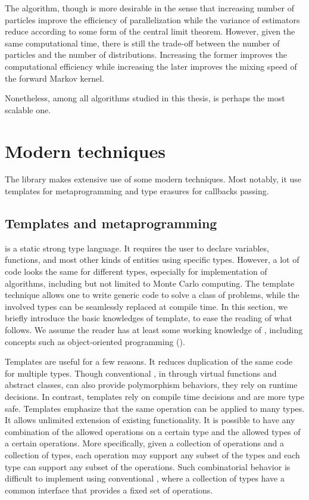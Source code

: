 The \smc algorithm, though is more desirable in the sense that increasing
number of particles improve the efficiency of parallelization while the
variance of estimators reduce according to some form of the central limit
theorem. However, given the same computational time, there is still the
trade-off between the number of particles and the number of distributions.
Increasing the former improves the computational efficiency while increasing
the later improves the mixing speed of the forward Markov kernel.

Nonetheless, among all algorithms studied in this thesis, \smc is perhaps the
most scalable one.

\section{Modern \protect\cpp techniques}
\label{sec:Modern C++ techniques}

The \vsmc library makes extensive use of some modern \cpp techniques. Most
notably, it use templates for metaprogramming and type erasures for callbacks
passing.

\subsection{Templates and metaprogramming}
\label{sub:Templates and metaprogramming}

\cpp is a static strong type language. It requires the user to declare
variables, functions, and most other kinds of entities using specific types.
However, a lot of code looks the same for different types, especially for
implementation of algorithms, including but not limited to Monte Carlo
computing. The \cpp template technique allows one to write generic code to
solve a class of problems, while the involved types can be seamlessly replaced
at compile time. In this section, we briefly introduce the basic knowledges of
\cpp template, to ease the reading of what follows. We assume the reader has
at least some working knowledge of \cpp, including concepts such as
object-oriented programming (\oop).

Templates are useful for a few reasons. It reduces duplication of the same
code for multiple types. Though conventional \oop, in \cpp through virtual
functions and abstract classes, can also provide polymorphism behaviors, they
rely on runtime decisions. In contrast, templates rely on compile time
decisions and are more type safe. Templates emphasize that the same operation
can be applied to many types. It allows unlimited extension of existing
functionality. It is possible to have any combination of the allowed
operations on a certain type and the allowed types of a certain operations.
More specifically, given a collection of operations and a collection of types,
each operation may support any subset of the types and each type can support
any subset of the operations. Such combinatorial behavior is difficult to
implement using conventional \oop, where a collection of types have a common
interface that provides a fixed set of operations.

